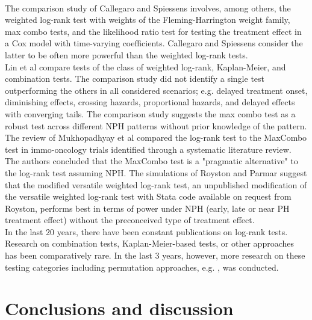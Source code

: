 \documentclass{article}
\begin{document}
\\The comparison study of Callegaro and Spiessens \cite{Callegaro.2017} involves, among others, the weighted log-rank test with weights of  the Fleming-Harrington weight family, max combo tests, and the likelihood ratio test for testing the treatment effect in a Cox model with time-varying coefficients. Callegaro and Spiessens  \cite{Callegaro.2017}  consider the latter to be often more powerful than the weighted log-rank tests.
\\
Lin et al \cite{Lin.2020} compare tests of the class of weighted log-rank, Kaplan-Meier, and combination tests. The comparison study did not identify a single test outperforming the others in all considered scenarios; e.g. delayed treatment onset, diminishing effects, crossing hazards, proportional hazards, and delayed effects with converging tails. The comparison study suggests the max combo test as a robust test across different NPH patterns without prior knowledge of the pattern. The review of Mukhopadhyay et al \cite{Mukhopadhyay.2022} compared the log-rank test to the MaxCombo test in immo-oncology trials identified through a systematic literature review. The authors concluded that the MaxCombo test is a "pragmatic alternative" to the log-rank test assuming NPH.
The simulations of Royston and Parmar \cite{Royston.2020} suggest that the modified versatile weighted log-rank test, an unpublished modification of the versatile weighted log-rank test \cite{Lee.2007} with Stata code available on request from Royston, performs best in terms of power under NPH (early, late or near PH treatment effect) without the preconceived type of treatment effect.
\\

\noindent In the last 20 years, there have been constant publications on log-rank tests. Research on combination tests, Kaplan-Meier-based tests, or other approaches has been comparatively rare. In the last 3 years, however, more research on these testing categories including permutation approaches, e.g. \cite{Ditzhaus.2020, Ditzhaus.2021}, was conducted.

\section{ Conclusions and discussion} \label{discussion}

\noindent 
\end{document}
